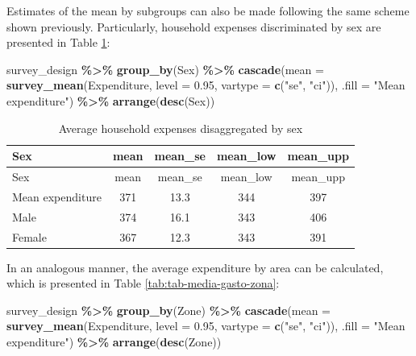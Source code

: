 \documentclass[
  english,
  12pt,
]{book}
\newenvironment{Shaded}{\begin{snugshade}}{\end{snugshade}}
\newcommand{\AttributeTok}[1]{\textcolor[rgb]{0.13,0.29,0.53}{#1}}
\newcommand{\FloatTok}[1]{\textcolor[rgb]{0.00,0.00,0.81}{#1}}
\newcommand{\FunctionTok}[1]{\textcolor[rgb]{0.13,0.29,0.53}{\textbf{#1}}}
\newcommand{\NormalTok}[1]{#1}
\newcommand{\SpecialCharTok}[1]{\textcolor[rgb]{0.81,0.36,0.00}{\textbf{#1}}}
\newcommand{\StringTok}[1]{\textcolor[rgb]{0.31,0.60,0.02}{#1}}
\begin{document}
Estimates of the mean by subgroups can also be made following the same scheme shown previously. Particularly, household expenses discriminated by sex are presented in Table \ref{tab:tab-media-gasto-sexo}:

\begin{Shaded}
\begin{Highlighting}[]
\NormalTok{survey\_design }\SpecialCharTok{\%\textgreater{}\%}
  \FunctionTok{group\_by}\NormalTok{(Sex) }\SpecialCharTok{\%\textgreater{}\%}
  \FunctionTok{cascade}\NormalTok{(}\AttributeTok{mean =} \FunctionTok{survey\_mean}\NormalTok{(Expenditure,}
                              \AttributeTok{level =} \FloatTok{0.95}\NormalTok{,}
                              \AttributeTok{vartype =} \FunctionTok{c}\NormalTok{(}\StringTok{"se"}\NormalTok{, }\StringTok{"ci"}\NormalTok{)),}
        \AttributeTok{.fill =} \StringTok{"Mean expenditure"}\NormalTok{) }\SpecialCharTok{\%\textgreater{}\%}
  \FunctionTok{arrange}\NormalTok{(}\FunctionTok{desc}\NormalTok{(Sex))}
\end{Highlighting}
\end{Shaded}

\begin{longtable}[]{@{}lcccc@{}}
\caption{\label{tab:tab-media-gasto-sexo}Average household expenses disaggregated by sex}\tabularnewline
\toprule\noalign{}
Sex & mean & mean\_se & mean\_low & mean\_upp \\
\midrule\noalign{}
\endfirsthead
\toprule\noalign{}
Sex & mean & mean\_se & mean\_low & mean\_upp \\
\midrule\noalign{}
\endhead
\bottomrule\noalign{}
\endlastfoot
Mean expenditure & 371 & 13.3 & 344 & 397 \\
Male & 374 & 16.1 & 343 & 406 \\
Female & 367 & 12.3 & 343 & 391 \\
\end{longtable}

In an analogous manner, the average expenditure by area can be calculated, which is presented in Table \ref{tab:tab-media-gasto-zona}:

\begin{Shaded}
\begin{Highlighting}[]
\NormalTok{survey\_design }\SpecialCharTok{\%\textgreater{}\%}
  \FunctionTok{group\_by}\NormalTok{(Zone) }\SpecialCharTok{\%\textgreater{}\%}
  \FunctionTok{cascade}\NormalTok{(}\AttributeTok{mean =} \FunctionTok{survey\_mean}\NormalTok{(Expenditure,}
                              \AttributeTok{level =} \FloatTok{0.95}\NormalTok{,}
                              \AttributeTok{vartype =} \FunctionTok{c}\NormalTok{(}\StringTok{"se"}\NormalTok{, }\StringTok{"ci"}\NormalTok{)),}
        \AttributeTok{.fill =} \StringTok{"Mean expenditure"}\NormalTok{) }\SpecialCharTok{\%\textgreater{}\%}
  \FunctionTok{arrange}\NormalTok{(}\FunctionTok{desc}\NormalTok{(Zone))}
\end{Highlighting}
\end{Shaded}
\end{document}
